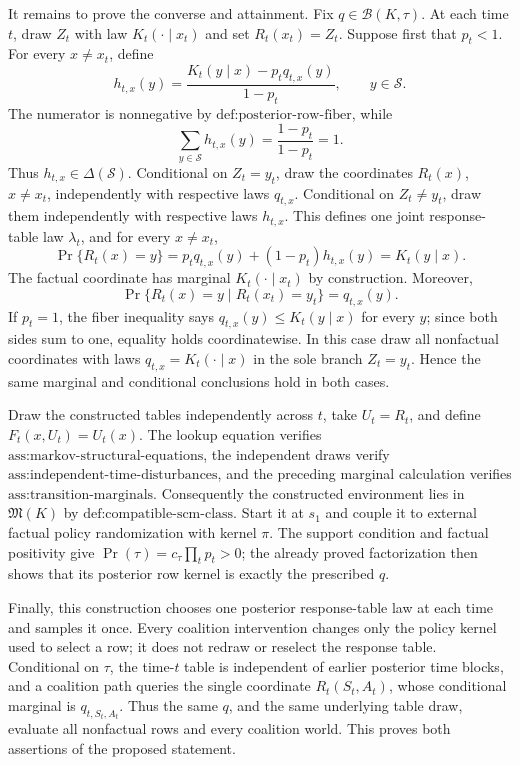 It remains to prove the converse and attainment.  Fix \(q\in\mathcal B(K,\tau)\).  At each time \(t\), draw \(Z_t\) with law \(K_t(\cdot\mid x_t)\) and set \(R_t(x_t)=Z_t\).  Suppose first that \(p_t<1\).  For every \(x\ne x_t\), define
\[
 h_{t,x}(y)=\frac{K_t(y\mid x)-p_tq_{t,x}(y)}{1-p_t},
 \qquad y\in\mathcal S.
\]
The numerator is nonnegative by \(\text{def:posterior-row-fiber}\), while
\[
 \sum_{y\in\mathcal S}h_{t,x}(y)
 =\frac{1-p_t}{1-p_t}=1.
\]
Thus \(h_{t,x}\in\Delta(\mathcal S)\).  Conditional on \(Z_t=y_t\), draw the coordinates \(R_t(x)\), \(x\ne x_t\), independently with respective laws \(q_{t,x}\).  Conditional on \(Z_t\ne y_t\), draw them independently with respective laws \(h_{t,x}\).  This defines one joint response-table law \(\lambda_t\), and for every \(x\ne x_t\),
\[
 \Pr\{R_t(x)=y\}
 =p_tq_{t,x}(y)+(1-p_t)h_{t,x}(y)
 =K_t(y\mid x).
\]
The factual coordinate has marginal \(K_t(\cdot\mid x_t)\) by construction.  Moreover,
\[
 \Pr\{R_t(x)=y\mid R_t(x_t)=y_t\}=q_{t,x}(y).
\]
If \(p_t=1\), the fiber inequality says \(q_{t,x}(y)\le K_t(y\mid x)\) for every \(y\); since both sides sum to one, equality holds coordinatewise.  In this case draw all nonfactual coordinates with laws \(q_{t,x}=K_t(\cdot\mid x)\) in the sole branch \(Z_t=y_t\).  Hence the same marginal and conditional conclusions hold in both cases.

Draw the constructed tables independently across \(t\), take \(U_t=R_t\), and define \(F_t(x,U_t)=U_t(x)\).  The lookup equation verifies \(\text{ass:markov-structural-equations}\), the independent draws verify \(\text{ass:independent-time-disturbances}\), and the preceding marginal calculation verifies \(\text{ass:transition-marginals}\).  Consequently the constructed environment lies in \(\mathfrak M(K)\) by \(\text{def:compatible-scm-class}\).  Start it at \(s_1\) and couple it to external factual policy randomization with kernel \(\pi\).  The support condition and factual positivity give \(\Pr(\tau)=c_\tau\prod_t p_t>0\); the already proved factorization then shows that its posterior row kernel is exactly the prescribed \(q\).

Finally, this construction chooses one posterior response-table law at each time and samples it once.  Every coalition intervention changes only the policy kernel used to select a row; it does not redraw or reselect the response table.  Conditional on \(\tau\), the time-\(t\) table is independent of earlier posterior time blocks, and a coalition path queries the single coordinate \(R_t(S_t,A_t)\), whose conditional marginal is \(q_{t,S_t,A_t}\).  Thus the same \(q\), and the same underlying table draw, evaluate all nonfactual rows and every coalition world.  This proves both assertions of the proposed statement.